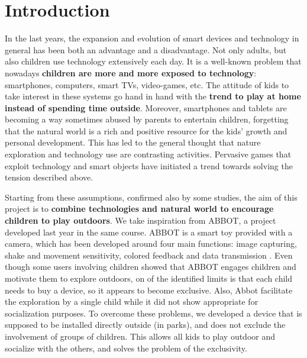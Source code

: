 \documentclass[a4paper,11pt]{report}
\begin{document}
\tableofcontents


\chapter{Introduction}
In the last years, the expansion and evolution of smart devices and technology in general has been both an advantage and a disadvantage.
Not only adults, but also children use technology extensively each day. It is a well-known problem that nowadays \textbf{children are more and more exposed to technology}: smartphones, computers, smart TVs, video-games, etc. The attitude of kids to take interest in these systems go hand in hand with the \textbf{trend to play at home instead of spending time outside}. Moreover, smartphones and tablets are becoming a way sometimes abused by parents to entertain children, forgetting that the natural world is a rich and positive resource for the kids' growth and personal development. This has led to the general thought that nature exploration and technology use are contrasting activities. Pervasive games that exploit technology and smart objects have initiated a trend towards solving the tension described above.\par
Starting from these assumptions, confirmed also by some studies, the aim of this project is to \textbf{combine technologies and natural world to encourage children to play outdoors}. We take inspiration from ABBOT, a project developed last year in the same course. ABBOT is a smart toy provided with a camera, which has been developed around four main functions: image capturing, shake and movement sensitivity, colored feedback and data transmission \cite{abbot}. Even though some users involving children showed that ABBOT engages children and motivate them to explore outdoors, on of the identified limits is that each child needs to buy a device, so it appears to become exclusive. Also, Abbot facilitate the exploration by a single child while it did not show appropriate for socialization purposes. To overcome these problems, we developed a device that is supposed to be installed directly outside (in parks), and does not exclude the involvement of groups of children. This allows all kids to play outdoor and socialize with the others, and solves the problem of the exclusivity.\par
\end{document}
